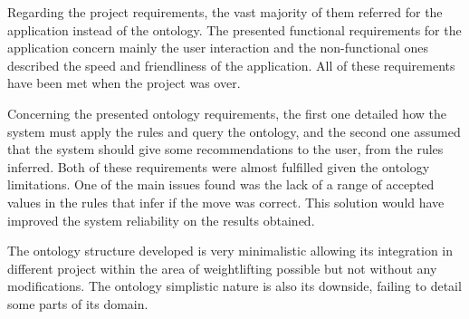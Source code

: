 Regarding the project requirements, the vast majority of them referred for the application instead of the ontology. The presented functional requirements for the application concern mainly the user interaction and the non-functional ones described the speed and friendliness of the application. All of these requirements have been met when the project was over.

Concerning the presented ontology requirements, the first one detailed how the system must apply the rules and query the ontology, and the second one assumed that the system should give some recommendations to the user, from the rules inferred. Both of these requirements were almost fulfilled given the ontology limitations. One of the main issues found was the lack of a range of accepted values in the rules that infer if the move was correct. This solution would have improved the system reliability on the results obtained.

The ontology structure developed is very minimalistic allowing its integration in different project within the area of weightlifting possible but not without any modifications. The ontology simplistic nature is also its downside, failing to detail some parts of its domain.